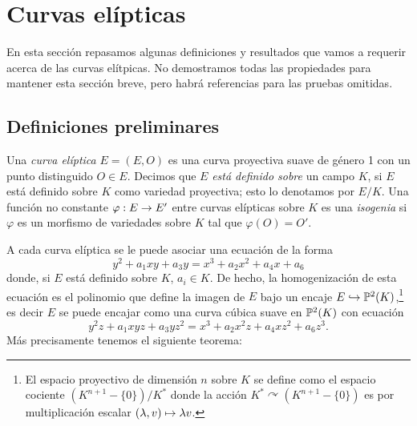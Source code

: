\documentclass[../../tesis_maestria]{subfiles}
\begin{document}
\section{Curvas el\'ipticas}

En esta secci\'on repasamos algunas definiciones y resultados que vamos a requerir acerca
de las curvas el\'itpicas. No demostramos todas las propiedades para mantener esta secci\'on breve,
pero habr\'a referencias para las pruebas omitidas.

\subsection{Definiciones preliminares}\label{sec:preliminares_curvas}%

\begin{defin}
  Una \emph{curva el\'iptica} $E=(E,O)$ es una curva proyectiva suave de g\'enero 1 con un punto
  distinguido $O\in E$. Decimos que $E$ \emph{est\'a definido sobre} un campo $K$, si $E$ est\'a
  definido sobre $K$ como variedad proyectiva; esto lo denotamos por $E/K$. Una funci\'on no
  constante $\varphi:E\rightarrow E'$ entre curvas el\'ipticas sobre $K$ es una \emph{isogenia} si
  $\varphi$ es un morfismo de variedades sobre $K$ tal que $\varphi(O)=O'$.
\end{defin}

A cada curva el\'iptica se le puede asociar una ecuaci\'on de la forma
\[
  y^2+a_1xy+a_3y=x^3+a_2x^2+a_4x+a_6
\]
donde, si $E$ est\'a definido sobre $K$, $a_i\in K$. De hecho, la homogenizaci\'on de esta
ecuaci\'on es el polinomio que define la imagen de $E$ bajo un encaje
$E\hookrightarrow\mathbb{P}^2(K)$,\footnote{El espacio proyectivo de dimensi\'on $n$ sobre $K$ se define
  como el espacio cociente $(K^{n+1}-\{0\})/K^*$ donde la acci\'on
  $K^*\curvearrowright(K^{n+1}-\{0\})$ es por multiplicaci\'on escalar $(\lambda,v)\mapsto\lambda v$.}
es decir $E$ se puede encajar como una curva c\'ubica suave en $\mathbb{P}^2(K)$ con ecuaci\'on
\begin{equation}\label{eq:weierstrass-homogenizada}
  y^2z+a_1xyz+a_3yz^2=x^3+a_2x^2z+a_4xz^2+a_6z^3.
\end{equation}
Más precisamente tenemos el siguiente teorema:
\end{document}
